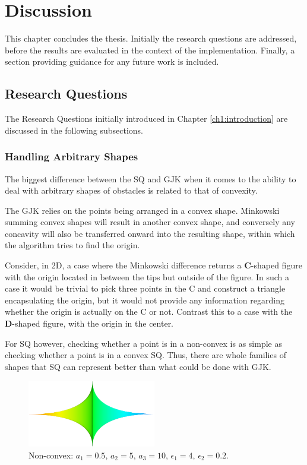 \chapter{Discussion} \label{ch5:discussion}
This chapter concludes the thesis. Initially the research questions are addressed, before the results are evaluated in the context of the implementation. Finally, a section providing guidance for any future work is included.

\section{Research Questions}

The Research Questions initially introduced in Chapter \ref{ch1:introduction} are discussed in the following subsections.

\subsection{Handling Arbitrary Shapes}\label{subsec:ArbiShapes}

The biggest difference between the \gls{SQ} and \gls{GJK} when it comes to the ability to deal with arbitrary shapes of obstacles is related to that of convexity.

The \gls{GJK} relies on the points being arranged in a convex shape. Minkowski summing convex shapes will result in another convex shape, and conversely any concavity will also be transferred onward into the resulting shape, within which the algorithm tries to find the origin.

Consider, in 2D, a case where the Minkowski difference returns a \textbf{C}-shaped figure with the origin located in between the tips but outside of the figure. In such a case it would be trivial to pick three points in the C and construct a triangle encapsulating the origin, but it would not provide any information regarding whether the origin is actually on the C or not. Contrast this to a case with the \textbf{D}-shaped figure, with the origin in the center.

For \gls{SQ} however, checking whether a point is in a non-convex is as simple as checking whether a point is in a convex \gls{SQ}. Thus, there are whole families of shapes that \gls{SQ} can represent better than what could be done with \gls{GJK}.

\begin{figure}[h]
	\centering
	\includegraphics[width=0.5\textwidth]{import/SQ_Concave}
	\caption{Non-convex: $a_1=0.5$, $a_2=5$, $a_3=10$, $\epsilon_1=4$, $\epsilon_2=0.2$. }
	\label{fig:SQ_ConcaveLink}
\end{figure} 

